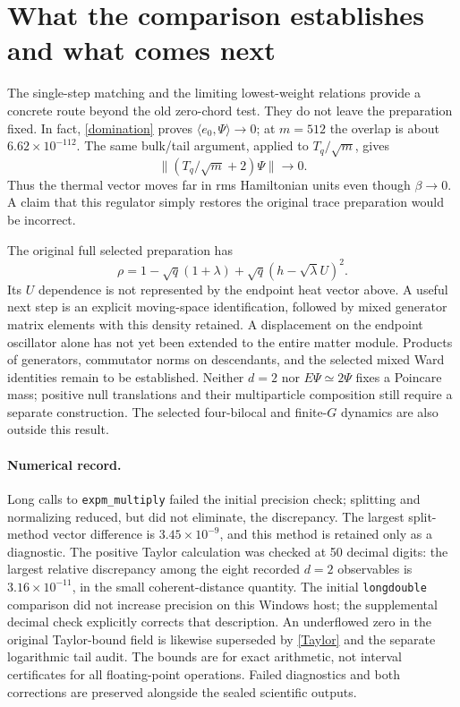 \documentclass[11pt]{article}
\begin{document}
\newpage
\section{What the comparison establishes and what comes next}
The single-step matching and the limiting lowest-weight
relations provide a concrete route beyond the old zero-chord
test. They do not leave the preparation fixed. In fact,
\eqref{domination} proves $\langle e_0,\Psi\rangle\to0$;
at $m=512$ the overlap is about $6.62\times10^{-112}$.
The same bulk/tail argument, applied to $T_q/\sqrt m$, gives
\[
 \|(T_q/\sqrt m+2)\Psi\|\longrightarrow0.
\]
Thus the thermal vector moves far in rms Hamiltonian units even
though $\beta\to0$. A claim that this regulator simply restores
the original trace preparation would be incorrect.

The original full selected preparation has
\[
 \rho=1-\sqrt q(1+\lambda)+\sqrt q(h-\sqrt\lambda U)^2.
\]
Its $U$ dependence is not represented by the endpoint heat
vector above. A useful next step is an explicit moving-space
identification, followed by mixed generator matrix elements
with this density retained. A displacement on the endpoint
oscillator alone has not yet been extended to the entire matter
module. Products of generators, commutator norms on descendants,
and the selected mixed Ward identities remain to be established.
Neither $d=2$ nor $E\Psi\simeq2\Psi$ fixes a Poincare mass;
positive null translations and their multiparticle composition
still require a separate construction. The selected four-bilocal
and finite-$G$ dynamics are also outside this result.

\paragraph{Numerical record.}
Long calls to \texttt{expm\_multiply} failed the initial
precision check; splitting and normalizing reduced, but did not
eliminate, the discrepancy. The largest split-method vector
difference is $3.45\times10^{-9}$, and this method is retained
only as a diagnostic. The positive Taylor calculation was
checked at 50 decimal digits: the largest relative discrepancy
among the eight recorded $d=2$ observables is
$3.16\times10^{-11}$, in the small coherent-distance quantity.
The initial \texttt{longdouble} comparison did not increase
precision on this Windows host; the supplemental decimal check
explicitly corrects that description. An underflowed zero in
the original Taylor-bound field is likewise superseded by
\eqref{Taylor} and the separate logarithmic tail audit.
The bounds are for exact arithmetic, not interval certificates
for all floating-point operations. Failed diagnostics and both
corrections are preserved alongside the sealed scientific outputs.
\end{document}
